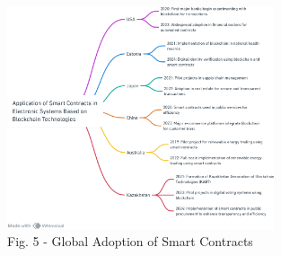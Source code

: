\begin{figure}[H]
	\centering
	\includegraphics[width=0.7\textwidth]{assets/82}
	\caption*{Fig. 5 - Global Adoption of Smart Contracts}
\end{figure}

